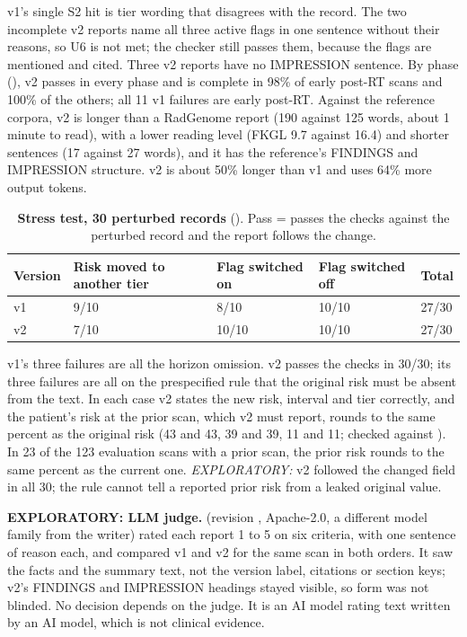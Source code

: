 \documentclass[11pt,a4paper]{article}
\begin{document}
v1's single S2 hit is tier wording that disagrees with the record. The two incomplete v2 reports name all three
active flags in one sentence without their reasons, so U6 is not met; the checker still passes them, because the
flags are mentioned and cited. Three v2 reports have no IMPRESSION sentence. By phase (), v2
passes in every phase and is complete in 98\% of early post-RT scans and 100\% of the others; all 11 v1 failures are
early post-RT. Against the reference corpora, v2 is longer than a RadGenome report (190 against 125 words, about 1
minute to read), with a lower reading level (FKGL 9.7 against 16.4) and shorter sentences (17 against 27 words), and
it has the reference's FINDINGS and IMPRESSION structure. v2 is about 50\% longer than v1 and uses 64\% more output
tokens.

\begin{table}[H]
\centering
\small
\renewcommand{\thetable}{S40}\renewcommand{\theHtable}{S40}
\caption{\textbf{Stress test, 30 perturbed records} (). Pass = passes the checks against the
perturbed record and the report follows the change.}
\label{tab:S40}
\begin{tabularx}{\linewidth}{@{}L R{2.6cm} R{2.4cm} R{2.4cm} R{1.4cm}@{}}
\toprule
Version & Risk moved to another tier & Flag switched on & Flag switched off & Total \\
\midrule
v1 & 9/10 & 8/10 & 10/10 & 27/30 \\
v2 & 7/10 & 10/10 & 10/10 & 27/30 \\
\bottomrule
\end{tabularx}
\end{table}

v1's three failures are all the horizon omission. v2 passes the checks in 30/30; its three failures are all on the
prespecified rule that the original risk must be absent from the text. In each case v2 states the new risk, interval
and tier correctly, and the patient's risk at the prior scan, which v2 must report, rounds to the same percent as the
original risk (43 and 43, 39 and 39, 11 and 11; checked against ). In 23 of the
123 evaluation scans with a prior scan, the prior risk rounds to the same percent as the current one.
\emph{EXPLORATORY:} v2 followed the changed field in all 30; the rule cannot tell a reported prior risk from a leaked
original value.

\textbf{EXPLORATORY: LLM judge.}  (revision , Apache-2.0, a different model
family from the writer) rated each report 1 to 5 on six criteria, with one sentence of reason each, and compared v1
and v2 for the same scan in both orders. It saw the facts and the summary text, not the version label, citations or
section keys; v2's FINDINGS and IMPRESSION headings stayed visible, so form was not blinded. No decision depends on
the judge. It is an AI model rating text written by an AI model, which is not clinical evidence.
\end{document}
